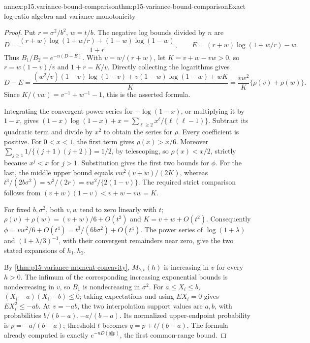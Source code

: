 \begin{annexitem}{annex:p15.variance-bound-comparison}{thm:p15-variance-bound-comparison}{Exact log-ratio algebra and variance monotonicity}
\begin{proof}
Put \(r=\sigma^2/b^2\), \(w=t/b\). The negative log bounds divided by
\(n\) are
\[
 D=\frac{(r+w)\log(1+w/r)+(1-w)\log(1-w)}{1+r},
 \qquad E=(r+w)\log(1+w/r)-w.
\]
Thus \(B_1/B_2=e^{-n(D-E)}\).
With \(v=w/(r+w)\), let \(K=v+w-vw>0\), so
\(r=w(1-v)/v\) and \(1+r=K/v\). Directly collecting the logarithms gives
\[
 D-E=\frac{
  (w^2/v)(1-v)\log(1-v)+v(1-w)\log(1-w)+wK}{K}
 =\frac{vw^2}{K}\{\rho(v)+\rho(w)\}.
\]
Since \(K/(vw)=v^{-1}+w^{-1}-1\), this is the asserted formula.

Integrating the convergent power series for \(-\log(1-x)\), or
multiplying it by \(1-x\), gives
\((1-x)\log(1-x)+x=\sum_{\ell\geq2}x^\ell/\{\ell(\ell-1)\}\).
Subtract its quadratic term and divide by \(x^2\) to obtain the
series for \(\rho\). Every coefficient is positive.
For \(0<x<1\), the first term gives \(\rho(x)>x/6\).
Moreover
\(\sum_{j\geq1}1/\{(j+1)(j+2)\}=1/2\), by telescoping, so
\(\rho(x)<x/2\), strictly because \(x^j<x\) for \(j>1\).
Substitution gives the first two bounds for \(\phi\).
For the last, the middle upper bound equals
\(vw^2(v+w)/(2K)\), whereas
\(t^3/(2b\sigma^2)=w^3/(2r)=vw^2/\{2(1-v)\}\).
The required strict comparison follows from
\((v+w)(1-v)<v+w-vw=K\).

For fixed \(b,\sigma^2\), both \(v,w\) tend to zero linearly with \(t\);
\(\rho(v)+\rho(w)=(v+w)/6+O(t^2)\) and
\(K=v+w+O(t^2)\). Consequently
\(\phi=vw^2/6+O(t^4)=t^3/(6b\sigma^2)+O(t^4)\).
The power series of \(\log(1+\lambda)\) and
\((1+\lambda/3)^{-1}\), with their convergent remainders near zero,
give the two stated expansions of \(h_1,h_2\).

By \cref{thm:p15-variance-moment-concavity}, \(M_{b,v}(h)\)
is increasing in \(v\) for every \(h>0\). The infimum of the
corresponding increasing exponential bounds is nondecreasing in \(v\),
so \(B_1\) is nondecreasing in \(\sigma^2\).
For \(a\leq X_i\leq b\),
\((X_i-a)(X_i-b)\leq0\); taking expectations and using \(EX_i=0\)
gives \(EX_i^2\leq-ab\).
At \(v=-ab\), the two interpolation support values are \(a,b\),
with probabilities \(b/(b-a),-a/(b-a)\).
Its normalized upper-endpoint probability is \(p=-a/(b-a)\);
threshold \(t\) becomes \(q=p+t/(b-a)\).
The formula already computed is exactly
\(e^{-nD(q\Vert p)}\), the first common-range bound.
\end{proof}
\end{annexitem}

